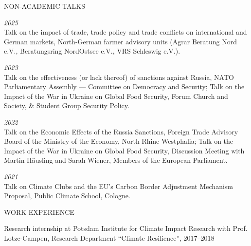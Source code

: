 \documentclass{article}
\begin{document}
\begin{minipage}[t]{0.12\textwidth}
    {\selectfont NON-ACADEMIC TALKS} \\
\end{minipage}
\hspace{5mm}
\begin{minipage}[t]{0.8\textwidth}
  \textit{2025} \\
    Talk on the impact of trade, trade policy and trade conflicts on international and German markets, North-German farmer advisory units (Agrar Beratung Nord e.V., Beratungsring NordOstsee e.V., VRS Schleswig e.V.). \par 
    \textit{2023} \\
    Talk on the effectiveness (or lack thereof) of sanctions against Russia, NATO Parliamentary Assembly --- Committee on Democracy and Security; Talk on the Impact of the War in Ukraine on Global Food Security, Forum Church and Society, \& Student Group Security Policy. \par 
    \textit{2022} \\
    Talk on the Economic Effects of the Russia Sanctions, Foreign Trade Advisory Board of the Ministry of the Economy, North Rhine-Westphalia; Talk on the Impact of the War in Ukraine on Global Food Security, Discussion Meeting with Martin Häusling and Sarah Wiener, Members of the European Parliament. \par
    \textit{2021} \\
    Talk on Climate Clubs and the EU's Carbon Border Adjustment Mechanism Proposal, Public Climate School, Cologne. \par
\end{minipage}
\medskip


\begin{minipage}[t]{0.12\textwidth}
    {\selectfont WORK EXPERIENCE} \\
\end{minipage}
\hspace{5mm}
\begin{minipage}[t]{0.8\textwidth}
    Research internship at Potsdam Institute for Climate Impact Research with Prof. Lotze-Campen, Research Department ``Climate Resilience'', 2017--2018
\end{minipage}
\medskip

\end{document}
